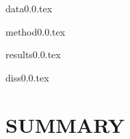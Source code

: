 \documentclass[useAMS,usenatbib]{mn2e}
\begin{document}
{data0.0.tex}


{method0.0.tex}

{results0.0.tex}

{diss0.0.tex}

\section{SUMMARY}
\end{document}
